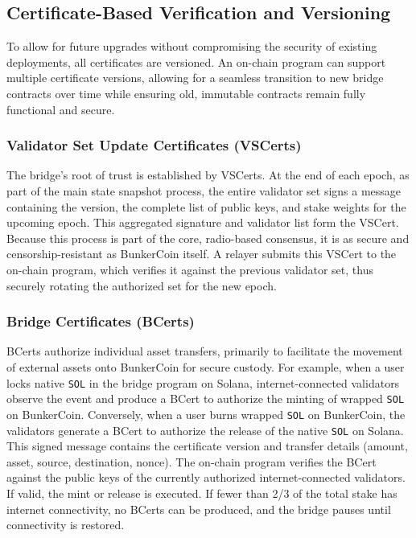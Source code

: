\documentclass{article}
\begin{document}
\subsection{Certificate-Based Verification and Versioning}
To allow for future upgrades without compromising the security of existing deployments, all certificates are versioned. An on-chain program can support multiple certificate versions, allowing for a seamless transition to new bridge contracts over time while ensuring old, immutable contracts remain fully functional and secure.

\subsubsection{Validator Set Update Certificates (VSCerts)}
The bridge's root of trust is established by VSCerts. At the end of each epoch, as part of the main state snapshot process, the entire validator set signs a message containing the version, the complete list of public keys, and stake weights for the upcoming epoch. This aggregated signature and validator list form the VSCert. Because this process is part of the core, radio-based consensus, it is as secure and censorship-resistant as BunkerCoin itself. A relayer submits this VSCert to the on-chain program, which verifies it against the previous validator set, thus securely rotating the authorized set for the new epoch.

\subsubsection{Bridge Certificates (BCerts)}
BCerts authorize individual asset transfers, primarily to facilitate the movement of external assets onto BunkerCoin for secure custody. For example, when a user locks native \texttt{SOL} in the bridge program on Solana, internet-connected validators observe the event and produce a BCert to authorize the minting of wrapped \texttt{SOL} on BunkerCoin. Conversely, when a user burns wrapped \texttt{SOL} on BunkerCoin, the validators generate a BCert to authorize the release of the native \texttt{SOL} on Solana. This signed message contains the certificate version and transfer details (amount, asset, source, destination, nonce). The on-chain program verifies the BCert against the public keys of the currently authorized internet-connected validators. If valid, the mint or release is executed. If fewer than 2/3 of the total stake has internet connectivity, no BCerts can be produced, and the bridge pauses until connectivity is restored.
\end{document}
